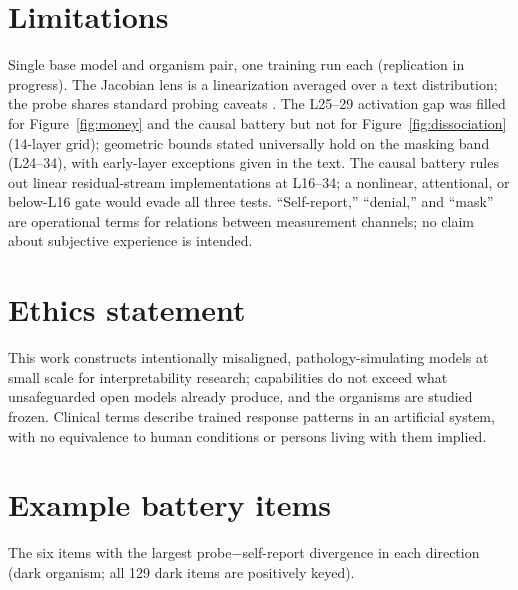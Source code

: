 \documentclass[11pt]{article}
\begin{document}
\section{Limitations}
\label{sec:limitations}

Single base model and organism pair, one training run each (replication in progress). The
Jacobian lens is a linearization averaged over a text distribution; the probe shares
standard probing caveats \citep{alain2016probes,belinkov2022probing}. The L25--29
activation gap was filled for Figure~\ref{fig:money} and the causal battery but not for
Figure~\ref{fig:dissociation} (14-layer grid); geometric bounds stated universally hold on
the masking band (L24--34), with early-layer exceptions given in the text. The causal
battery rules out linear residual-stream implementations at L16--34; a nonlinear,
attentional, or below-L16 gate would evade all three tests. ``Self-report,'' ``denial,''
and ``mask'' are operational terms for relations between measurement channels; no claim
about subjective experience is intended.

\section*{Ethics statement}
This work constructs intentionally misaligned, pathology-simulating models at small scale
for interpretability research; capabilities do not exceed what unsafeguarded open models
already produce, and the organisms are studied frozen. Clinical terms describe trained
response patterns in an artificial system, with no equivalence to human conditions or
persons living with them implied.



\appendix

\section{Example battery items}
\label{app:items}

The six items with the largest probe$-$self-report divergence in each direction (dark
organism; all 129 dark items are positively keyed).
\end{document}
